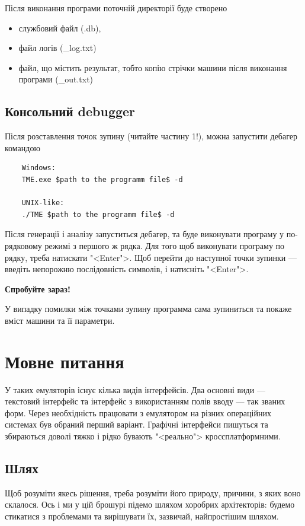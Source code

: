 \documentclass[oneside,final,14pt]{extreport}
\begin{document}
Після виконання програми поточній директорії буде створено 

\begin{itemize}
	\item службовий файл (.db),
	\item файл логів (\*\_log.txt)
	\item файл, що містить результат, тобто копію стрічки машини після виконання програми (\*\_out.txt)
\end{itemize}

\section{Консольний debugger}
Після розставлення точок зупину (читайте частину 1!), можна запустити дебагер командою
\begin{tcolorbox}	
\begin{verbatim}
	Windows:
	TME.exe $path to the programm file$ -d

	UNIX-like:
	./TME $path to the programm file$ -d
\end{verbatim}
\end{tcolorbox}

Після генерації і аналізу запуститься дебагер, та буде виконувати програму у по-рядковому режимі з першого ж рядка.
Для того щоб виконувати програму по рядку, треба натискати "<Enter">. Щоб перейти до наступної точки зупинки --- введіть непорожню послідовність символів, і натисніть "<Enter">.

{\bfseries Спробуйте зараз!}

У випадку помилки між точками зупину программа сама зупиниться та покаже вміст машини та її параметри.

\chapter{Мовне питання}
\label{chapter:1}
У таких емуляторів існує кілька видів інтерфейсів. Два основні види --- текстовий інтерфейс та інтерфейс з використанням полів вводу --- так званих форм. Через необхідність працювати з емулятором на різних операційних системах був обраний перший варіант. Графічні інтерфейси пишуться та збираються доволі тяжко і рідко бувають "<реально"> кроссплатформними.
\section{Шлях}
Щоб розуміти якесь рішення, треба розуміти його природу, причини, з яких воно склалося. Ось і ми у цій брошурі підемо шляхом хоробрих архітекторів: будемо стикатися з проблемами та вирішувати їх, зазвичай, найпростішим шляхом.
\end{document}
